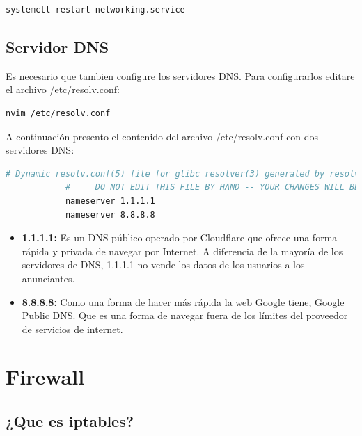 									
			\begin{lstlisting}[language=Bash, caption=Reiniciar servicio de RED]			
				systemctl restart networking.service
			\end{lstlisting}
			
		
		\subsection{Servidor DNS}
			
		
			Es necesario que tambien configure los servidores DNS. Para configurarlos editare el archivo /etc/resolv.conf:\par
	
		
			\begin{lstlisting}[language=Bash, caption=Editar archivo resolv]		
				nvim /etc/resolv.conf
			\end{lstlisting}
		
			
			A continuación presento el contenido del archivo /etc/resolv.conf con dos servidores DNS:

		
			\begin{lstlisting}[language=Bash, caption=Servidores DNS]	
			# Dynamic resolv.conf(5) file for glibc resolver(3) generated by resolvconf(8)
			#     DO NOT EDIT THIS FILE BY HAND -- YOUR CHANGES WILL BE OVERWRITTEN	
			nameserver 1.1.1.1    
			nameserver 8.8.8.8
			\end{lstlisting}
		

			\begin{itemize}
				
				\item \textbf{1.1.1.1:} Es un DNS público operado por Cloudflare que ofrece una forma rápida y privada de navegar por Internet. A diferencia de la mayoría de los servidores de DNS, 1.1.1.1 no vende los datos de los usuarios a los anunciantes.

				\item \textbf{8.8.8.8:} Como una forma de hacer más rápida la web Google tiene, Google Public DNS. Que es una forma de navegar fuera de los límites del proveedor de servicios de internet.

			\end{itemize}

				
	\section{Firewall}
		
		\subsection{¿Que es iptables?}
		
